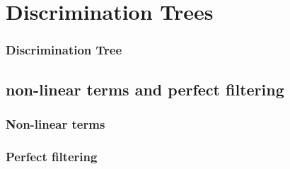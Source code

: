 
\section{Discrimination Trees}

\begin{frame}
	\frametitle{Discrimination Tree}
	
\end{frame}

\subsection{non-linear terms and perfect filtering}

\begin{frame}
	\frametitle{Non-linear terms}
	
\end{frame}

\begin{frame}
	
\end{frame}

\begin{frame}
	\frametitle{Perfect filtering}
	
\end{frame}